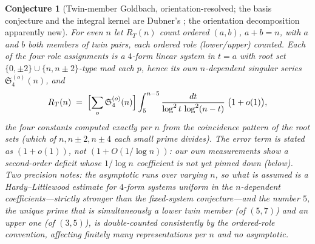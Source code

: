 \documentclass[11pt]{article}
\newtheorem{conjecture}{Conjecture}
\theoremstyle{definition}
\newcommand{\SG}{\mathfrak S}
\begin{document}
\setcounter{conjecture}{16}%
\begin{conjecture}[Twin-member Goldbach, orientation-resolved; the
basis conjecture and the integral kernel are Dubner's
\cite{Dubner2000}; the orientation decomposition apparently
new]\label{c17}
For even $n$ let $R_T(n)$ count ordered $(a,b)$, $a+b=n$, with $a$
and $b$ both members of twin pairs, each ordered role (lower/upper)
counted.  Each of the four role assignments is a $4$-form linear
system in $t=a$ with root set
$\{0,\pm2\}\cup\{n,n\pm2\}$-type mod each $p$, hence its own
$n$-dependent singular series $\SG_4^{(o)}(n)$, and
\[
R_T(n)\;=\;\Bigl[\sum_{o}\SG_4^{(o)}(n)\Bigr]
\int_5^{n-5}\frac{dt}{\log^2t\,\log^2(n-t)}\;\bigl(1+o(1)\bigr),
\]
the four constants computed exactly per $n$ from the coincidence
pattern of the root sets (which of $n,n\pm2,n\pm4$ each small prime
divides).  The error term is stated as $(1+o(1))$, not
$(1+O(1/\log n))$: our own measurements show a second-order deficit
whose $1/\log n$ coefficient is not yet pinned down (below).  Two precision
notes: the
asymptotic runs over \emph{varying} $n$, so what is assumed is a
Hardy--Littlewood estimate for $4$-form systems \emph{uniform in the
$n$-dependent coefficients}---strictly stronger than the fixed-system
conjecture---and the number $5$, the unique prime that is
simultaneously a lower twin member (of $(5,7)$) and an upper one (of
$(3,5)$), is double-counted consistently by the ordered-role
convention, affecting finitely many representations per $n$ and no
asymptotic.
\end{conjecture}
\end{document}
